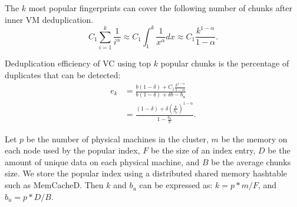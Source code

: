 The  $k$ most popular fingerprints can cover the following number of chunks after inner VM 
deduplication.
\[
C_1 \sum_{i=1}^{k}\frac{1}{i^\alpha} \approx  
C_1 \int_{1}^{k}\frac{1}{x^\alpha} dx  \approx  C_1\frac{  k^{1-\alpha}} {1-\alpha}.
\]

Deduplication efficiency of VC using top $k$ popular chunks
is the percentage of duplicates that can be detected:  
\begin{equation}
\begin{split}
e_k &= 
\frac{ b(1-\delta) + C_1\frac{  k^{1-\alpha}} {1-\alpha}} 
{b(1-\delta)  + \delta b - b_u }\\
&= 
\frac{ (1-\delta) + \delta  (\frac{k}{b_u})^{1-\alpha}}
{ 1- \frac{b_u}{b} }.
\end{split}
\end{equation}






Let $p$ be the number of physical machines in the cluster, $m$ be the memory on each node used by the popular
index, $F$ be the size of an index entry,
$D$ be the amount of unique data on each physical machine, and 
$B$ be the average chunks size. We store the popular index using a distributed shared memory hashtable
such as MemCacheD.  Then $k$ and $b_u$ can be expressed as:
$
k = p*m/F$, and $b_u = p*D/B.
$

